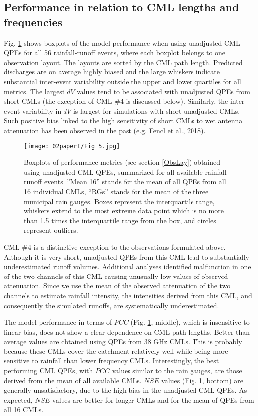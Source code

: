 \documentclass{ctuthesis}\usepackage[]{graphicx}\usepackage[]{color}
\begin{document}
\subsection{Performance in relation to CML lengths and frequencies}

Fig. \ref{2fig5} shows boxplots of the model performance when using unadjusted CML QPEs for all 56 rainfall-runoff events, where each boxplot belongs to one observation layout. The layouts are sorted by the CML path length. Predicted discharges are on average highly biased and the large whiskers indicate substantial inter-event variability outside the upper and lower quartiles for all metrics. The largest $dV$ values tend to be associated with unadjusted QPEs from short CMLs (the exception of CML \#4 is discussed below). Similarly, the inter-event variability in $dV$ is largest for simulations with short unadjusted CMLs. Such positive bias linked to the high sensitivity of short CMLs to wet antenna attenuation has been observed in the past (e.g. Fencl et al., 2018).

\begin{figure}[H]
\begin{center}
\texttt{[image: 02paperI/Fig 5.jpg]}
\caption{Boxplots of performance metrics (see section \ref{ObsLay}) obtained using unadjusted CML QPEs, summarized for all available rainfall-runoff events. ”Mean 16” stands for the mean of all QPEs from all 16 individual CMLs, “RGs” stands for the mean of the three municipal rain gauges. Boxes represent the interquartile range, whiskers extend to the most extreme data point which is no more than 1.5 times the interquartile range from the box, and circles represent outliers.} \label{2fig5}
\end{center}
\end{figure}

CML \#4 is a distinctive exception to the observations formulated above. Although it is very short, unadjusted QPEs from this CML lead to substantially underestimated runoff volumes. Additional analyses identified malfunction in one of the two channels of this CML causing unusually low values of observed attenuation. Since we use the mean of the observed attenuation of the two channels to estimate rainfall intensity, the intensities derived from this CML, and consequently the simulated runoffs, are systematically underestimated.

The model performance in terms of $PCC$ (Fig. \ref{2fig5}, middle), which is insensitive to linear bias, does not show a clear dependence on CML path lengths. Better-than-average values are obtained using QPEs from 38 GHz CMLs. This is probably because these CMLs cover the catchment relatively well while being more sensitive to rainfall than lower frequency CMLs. Interestingly, the best performing CML QPEs, with $PCC$ values similar to the rain gauges, are those derived from the mean of all available CMLs. $NSE$ values (Fig. \ref{2fig5}, bottom) are generally unsatisfactory, due to the high bias in the unadjusted CML QPEs. As expected, $NSE$ values are better for longer CMLs and for the mean of QPEs from all 16 CMLs.
 
\end{document}

